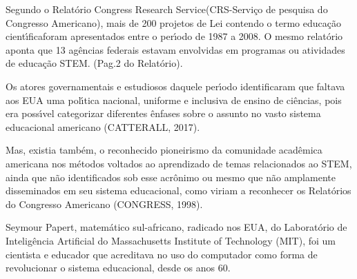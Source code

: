 \documentclass[
12pt,		%
openright,	%
twoside,  %
a4paper,			%
chapter=TITLE,		%
english,			%
french,				%
spanish,			%
brazil				%
]{USPSC-classe/USPSC}
\begin{document}
Segundo o Relat\'orio \textquotedbl Congress Research Service\textquotedbl  (CRS-Servi\c{c}o de pesquisa do Congresso Americano), mais de 200 projetos de Lei contendo o termo \textquotedbl educa\c{c}\~ao cient\'{\i}fica\textquotedbl  foram apresentados entre o per\'{\i}odo de 1987 a 2008. O mesmo relat\'orio aponta que 13 ag\^encias federais estavam envolvidas em programas ou atividades de educa\c{c}\~ao \textquotedbl STEM\textquotedbl . (Pag.2 do Relat\'orio).

















Os atores governamentais e estudiosos daquele per\'{\i}odo identificaram que faltava aos EUA uma pol\'{\i}tica nacional, uniforme e inclusiva de ensino de ci\^encias, pois era poss\'{\i}vel categorizar diferentes \^enfases sobre o assunto no vasto sistema educacional americano (CATTERALL, 2017).

















Mas, existia tamb\'em, o reconhecido pioneirismo da comunidade acad\^emica americana nos m\'etodos voltados ao aprendizado de temas relacionados ao STEM, ainda que n\~ao identificados sob esse acr\^onimo ou mesmo que n\~ao amplamente disseminados em seu sistema educacional, como viriam a reconhecer os Relat\'orios do Congresso Americano (CONGRESS, 1998).

















Seymour Papert, matem\'atico sul-africano, radicado nos EUA, do Laborat\'orio de Intelig\^encia Artificial do Massachusetts Institute of Technology (MIT), foi um  cientista e educador que acreditava  no  uso do computador como forma de revolucionar o sistema  educacional,  desde os anos 60.
\end{document}
